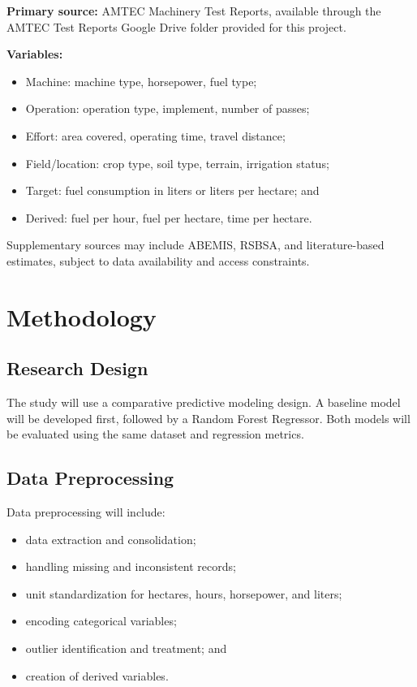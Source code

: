 \documentclass[11pt,twocolumn]{article}
\begin{document}
\textbf{Primary source:} AMTEC Machinery Test Reports, available through the AMTEC Test Reports Google Drive folder provided for this project.

\vspace{10pt}

\textbf{Variables:}
\begin{itemize}
\item Machine: machine type, horsepower, fuel type;
\item Operation: operation type, implement, number of passes;
\item Effort: area covered, operating time, travel distance;
\item Field/location: crop type, soil type, terrain, irrigation status;
\item Target: fuel consumption in liters or liters per hectare; and
\item Derived: fuel per hour, fuel per hectare, time per hectare.
\end{itemize}

\vspace{10pt}

Supplementary sources may include ABEMIS, RSBSA, and literature-based estimates, subject to data availability and access constraints.

\section*{Methodology}

\subsection*{Research Design}

The study will use a comparative predictive modeling design. A baseline model will be developed first, followed by a Random Forest Regressor. Both models will be evaluated using the same dataset and regression metrics.

\vspace{10pt}

\subsection*{Data Preprocessing}

Data preprocessing will include:
\begin{itemize}
\item data extraction and consolidation;
\item handling missing and inconsistent records;
\item unit standardization for hectares, hours, horsepower, and liters;
\item encoding categorical variables;
\item outlier identification and treatment; and
\item creation of derived variables.
\end{itemize}
\end{document}
